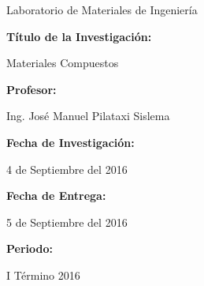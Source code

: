 \documentclass[a4paper,11pt]{article}
\begin{document}
\begin{center}
Laboratorio de Materiales de Ingeniería
\end{center}
\hspace{2.9cm} \Large{ \textbf {Título de la Investigación:}}
\begin{center}
Materiales Compuestos
\end{center}
\hspace{2.9cm} \Large{ \textbf {Profesor:}}
\begin{center}
Ing. José Manuel Pilataxi Sislema
\end{center}
\hspace{2.9cm} \Large{ \textbf {Fecha de Investigación:}}
\begin{center}
4 de Septiembre del 2016
\end{center}
\hspace{3cm} \Large{ \textbf {Fecha de Entrega:}}
\begin{center}
5 de Septiembre del 2016
\end{center}
\hspace{3.2cm} \Large{\textbf {Periodo:}}
\begin{center}
I Término 2016
\end{center}
\vspace{1.5cm}
 \hfill {}
\thispagestyle{empty}
\end{document}
